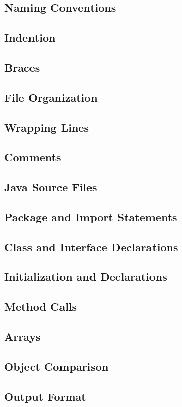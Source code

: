 

\subsection{Naming Conventions}
\subsection{Indention}
\subsection{Braces}
\subsection{File Organization}
\subsection{Wrapping Lines}
\subsection{Comments}
\subsection{Java Source Files}
\subsection{Package and Import Statements}
\subsection{Class and Interface Declarations}
\subsection{Initialization and Declarations}
\subsection{Method Calls}
\subsection{Arrays}
\subsection{Object Comparison}
\subsection{Output Format}
